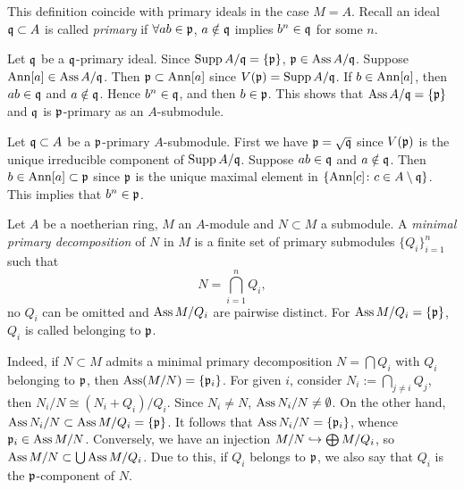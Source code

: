         \begin{remark}\label{rem: primary submodule and primary ideal}
            This definition coincide with primary ideals in the case $M = A$.
            Recall an ideal ${\mathfrak{q}} \subset A$ is called \textit{primary} if $\forall ab \in {\mathfrak{p}}$, 
            $a \notin {\mathfrak{q}}$ implies $b^n \in {\mathfrak{q}}$ for some $n$. 
            
            Let ${\mathfrak{q}}$ be a ${\mathfrak{q}}$-primary ideal.
            Since $\operatorname{Supp} A/{\mathfrak{q}} = \{{\mathfrak{p}}\}$, ${\mathfrak{p}} \in \operatorname{Ass} A/{\mathfrak{q}}$.
            Suppose $\operatorname{Ann} [a] \in \operatorname{Ass} A/{\mathfrak{q}}$.
            Then ${\mathfrak{p}} \subset \operatorname{Ann} [a]$ since $V({\mathfrak{p}}) = \operatorname{Supp} A/{\mathfrak{q}}$.
            If $b \in \operatorname{Ann} [a]$, then $ab \in {\mathfrak{q}}$ and $a\notin {\mathfrak{q}}$.
            Hence $b^n \in {\mathfrak{q}}$, and then $b \in {\mathfrak{p}}$.
            This shows that $\operatorname{Ass} A/{\mathfrak{q}} = \{{\mathfrak{p}}\}$ and ${\mathfrak{q}}$ is ${\mathfrak{p}}$-primary as an $A$-submodule. 

            Let ${\mathfrak{q}} \subset A$ be a ${\mathfrak{p}}$-primary $A$-submodule.
            First we have ${\mathfrak{p}} = \sqrt{{\mathfrak{q}}}$ since $V({\mathfrak{p}})$ is the unique irreducible component of $\operatorname{Supp} A/{\mathfrak{q}}$.
            Suppose $ab \in {\mathfrak{q}}$ and $a\notin {\mathfrak{q}}$.
            Then $b \in \operatorname{Ann} [a] \subset {\mathfrak{p}}$ since ${\mathfrak{p}}$ is the unique maximal element in $\{ \operatorname{Ann} [c] \colon c \in A \setminus {\mathfrak{q}}\}$.
            This implies that $b^n \in {\mathfrak{p}}$.
        \end{remark}

        \begin{definition}\label{def: minimal primary decomposition}
            Let $A$ be a noetherian ring, $M$ an $A$-module and $N \subset M$ a submodule.
            A \textit{minimal primary decomposition} of $N$ in $M$ is a finite set of primary submodules $\{Q_i\}_{i=1}^n$ such that 
            \[ N = \bigcap_{i=1}^n Q_i, \] 
            no $Q_i$ can be omitted and $\operatorname{Ass} M/Q_i$ are pairwise distinct.
            For $\operatorname{Ass} M/Q_i = \{{\mathfrak{p}}\}$, $Q_i$ is called belonging to ${\mathfrak{p}}$.
        \end{definition}

        Indeed, if $N \subset M$ admits a minimal primary decomposition $N = \bigcap Q_i$ with $Q_i$ belonging to ${\mathfrak{p}}$,
        then $\operatorname{Ass}(M/N) = \{{\mathfrak{p}}_i\}$.
        For given $i$, consider $N_i := \bigcap_{j\neq i} Q_j$, then $N_i/N \cong (N_i+Q_i)/Q_i$.
        Since $N_i \neq N$, $\operatorname{Ass} N_i/N \neq \emptyset$.
        On the other hand, $\operatorname{Ass} N_i/N \subset \operatorname{Ass} M/Q_i = \{{\mathfrak{p}}\}$.
        It follows that $\operatorname{Ass} N_i/N = \{{\mathfrak{p}}_i\}$, whence ${\mathfrak{p}}_i \in \operatorname{Ass} M/N$.
        Conversely, we have an injection $M/N \hookrightarrow \bigoplus M/Q_i$, so $\operatorname{Ass} M/N \subset \bigcup \operatorname{Ass} M/Q_i$.
        Due to this, if $Q_i$ belongs to ${\mathfrak{p}}$, we also say that $Q_i$ is the ${\mathfrak{p}}$-component of $N$.
    
